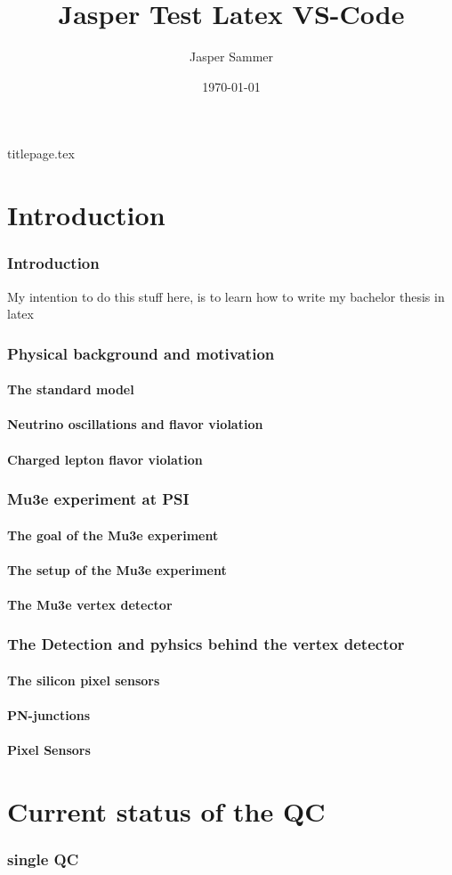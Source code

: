 \documentclass[a4paper, 12pt]{article}
\title{Jasper Test Latex VS-Code}
\author{Jasper Sammer}
\date{\today}
\begin{document}
{titlepage.tex}



\newpage
{}
\tableofcontents
\newpage
{}

\part{Introduction}
\section{Introduction}
My intention to do this stuff here, is to learn how to write my bachelor thesis in latex

\section{Physical background and motivation}
\subsection{The standard model}
\subsection{Neutrino oscillations and flavor violation}
\subsection{Charged lepton flavor violation}

\section{Mu3e experiment at PSI}
\subsection{The goal of the Mu3e experiment}
\subsection{The setup of the Mu3e experiment}
\subsection{The Mu3e vertex detector}

\section{The Detection and pyhsics behind the vertex detector}
\subsection{The silicon pixel sensors}
\subsection{PN-junctions}
\subsection{Pixel Sensors}

\part{Current status of the QC}
\section{single QC}
\end{document}
